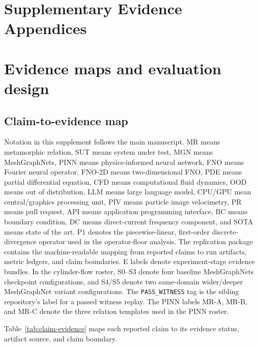 \documentclass[preprint,12pt]{elsarticle}
\begin{document}
\section*{Supplementary Evidence Appendices}

\renewcommand{\thetable}{A\arabic{table}}
\setcounter{table}{0}
\section{Evidence maps and evaluation design}
\label{app:evidence-design}

\subsection{Claim-to-evidence map}
\label{app:claim-evidence}

Notation in this supplement follows the main manuscript. MR means metamorphic
relation, SUT means system under test, MGN means MeshGraphNets, PINN means
physics-informed neural network, FNO means Fourier neural operator, FNO-2D
means two-dimensional FNO, PDE means partial differential equation, CFD means
computational fluid dynamics, OOD means out of distribution, LLM means large
language model, CPU/GPU mean central/graphics processing unit, PIV means
particle image velocimetry, PR means pull request, API means application
programming interface, BC means boundary condition, DC means direct-current
frequency component, and SOTA means state of the art. P1 denotes the
piecewise-linear, first-order discrete-divergence operator used in the
operator-floor analysis.
The replication package contains the machine-readable mapping from reported
claims to run artifacts, metric ledgers, and claim boundaries. E labels denote
experiment-stage evidence bundles. In the cylinder-flow roster, S0--S3 denote
four baseline MeshGraphNets checkpoint configurations, and S4/S5 denote two
same-domain wider/deeper MeshGraphNet variant configurations. The
\texttt{PASS\_WITNESS} tag is the sibling repository's label for a passed
witness replay. The PINN labels MR-A, MR-B, and MR-C denote the three relation
templates used in the PINN roster.

Table~\ref{tab:claim-evidence} maps each reported claim to its evidence
status, artifact source, and claim boundary.
\end{document}
